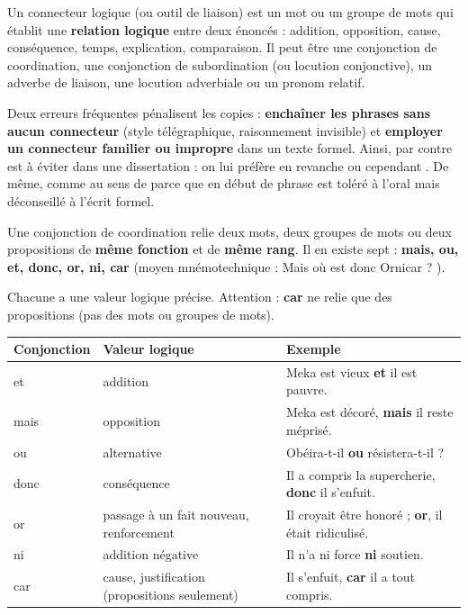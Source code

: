 \documentclass[11pt]{article}
\newcommand{\cle}[1]{{\popxbold\color{popdark}#1}}
\newcounter{popsec}
\newcounter{popsub}
\newcommand{\courssub}[1]{%
  \stepcounter{popsub}%
  \par\vspace{9pt}\noindent{\popxbold\fontsize{11.5}{13}\selectfont\color{popink}{\color{poporange}\thepopsec.\thepopsub}\hspace{6pt}#1}\par\nopagebreak\vspace{4pt}
}
\begin{document}
\begin{definition}
Un \cle{connecteur logique} (ou outil de liaison) est un mot ou un groupe de mots qui établit une \textbf{relation logique} entre deux énoncés : addition, opposition, cause, conséquence, temps, explication, comparaison. Il peut être une conjonction de coordination, une conjonction de subordination (ou locution conjonctive), un adverbe de liaison, une locution adverbiale ou un pronom relatif.
\end{definition}

\begin{attention}
Deux erreurs fréquentes pénalisent les copies : \textbf{enchaîner les phrases sans aucun connecteur} (style télégraphique, raisonnement invisible) et \textbf{employer un connecteur familier ou impropre} dans un texte formel. Ainsi, \og par contre \fg{} est à éviter dans une dissertation : on lui préfère \og en revanche \fg{} ou \og cependant \fg{}. De même, \og comme \fg{} au sens de \og parce que \fg{} en début de phrase est toléré à l'oral mais déconseillé à l'écrit formel.
\end{attention}

\courssub{Les conjonctions de coordination}

\begin{definition}
Une \cle{conjonction de coordination} relie deux mots, deux groupes de mots ou deux propositions de \textbf{même fonction} et de \textbf{même rang}. Il en existe sept : \textbf{mais, ou, et, donc, or, ni, car} (moyen mnémotechnique : \og Mais où est donc Ornicar ? \fg{}).
\end{definition}

Chacune a une valeur logique précise. Attention : \textbf{car} ne relie que des propositions (pas des mots ou groupes de mots).

\begin{center}
\begin{tabularx}{\linewidth}{|l|l|X|}
\hline
\rowcolor{popblueL} \textbf{Conjonction} & \textbf{Valeur logique} & \textbf{Exemple} \\
\hline
\cle{et} & addition & Meka est vieux \textbf{et} il est pauvre. \\
\hline
\cle{mais} & opposition & Meka est décoré, \textbf{mais} il reste méprisé. \\
\hline
\cle{ou} & alternative & Obéira-t-il \textbf{ou} résistera-t-il ? \\
\hline
\cle{donc} & conséquence & Il a compris la supercherie, \textbf{donc} il s'enfuit. \\
\hline
\cle{or} & passage à un fait nouveau, renforcement & Il croyait être honoré ; \textbf{or}, il était ridiculisé. \\
\hline
\cle{ni} & addition négative & Il n'a ni force \textbf{ni} soutien. \\
\hline
\cle{car} & cause, justification (propositions seulement) & Il s'enfuit, \textbf{car} il a tout compris. \\
\hline
\end{tabularx}
\end{center}
\end{document}

